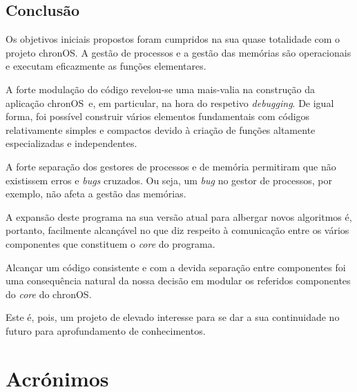 \documentclass[10pt,oneside]{estiloUBI}
\newcommand{\chronOS}{\textsf{chronOS}}
\begin{document}
	
	\section{Conclusão}
	
	Os objetivos iniciais propostos foram cumpridos na sua quase totalidade com o projeto \chronOS. A gestão de processos e a gestão das memórias são operacionais e executam eficazmente as funções elementares.
	
	A forte modulação do código revelou-se uma mais-valia na construção da aplicação \chronOS~e, em particular, na hora do respetivo \textit{debugging}. De igual forma, foi possível construir vários elementos fundamentais com códigos relativamente simples e compactos devido à criação de funções altamente especializadas e independentes.
	
	A forte separação dos gestores de processos e de memória permitiram que não existissem erros e \textit{bugs} cruzados. Ou seja, um \textit{bug} no gestor de processos, por exemplo, não afeta a gestão das memórias.
	
	A expansão deste programa na sua versão atual para albergar novos algoritmos é, portanto, facilmente alcançável no que diz respeito à comunicação entre os vários componentes que constituem o \textit{core} do programa.
	
	Alcançar um código consistente e com a devida separação entre componentes foi uma consequência natural da nossa decisão em modular os referidos componentes do \textit{core} do \chronOS.
	
	Este é, pois, um projeto de elevado interesse para se dar a sua continuidade no futuro para aprofundamento de conhecimentos.
	
	
	\chapter*{Acrónimos}
    \label{sec:acron}
    
    \begin{acronym}[FCFS]
    \end{acronym}
	
\end{document}
